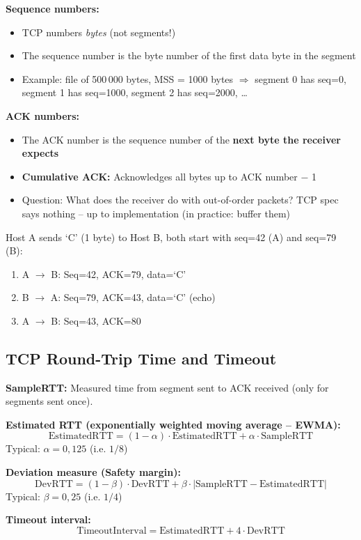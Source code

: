 \begin{keybox}
\textbf{Sequence numbers:}
\begin{itemize}[noitemsep]
    \item TCP numbers \emph{bytes} (not segments!)
    \item The sequence number is the byte number of the first data byte in the segment
    \item Example: file of 500\,000 bytes, MSS = 1000 bytes $\Rightarrow$ segment 0 has seq=0, segment 1 has seq=1000, segment 2 has seq=2000, \ldots
\end{itemize}

\textbf{ACK numbers:}
\begin{itemize}[noitemsep]
    \item The ACK number is the sequence number of the \textbf{next byte the receiver expects}
    \item \textbf{Cumulative ACK:} Acknowledges all bytes up to ACK number $-$ 1
    \item Question: What does the receiver do with out-of-order packets? TCP spec says nothing -- up to implementation (in practice: buffer them)
\end{itemize}
\end{keybox}

\begin{exambox}
Host A sends `C' (1 byte) to Host B, both start with seq=42 (A) and seq=79 (B):
\begin{enumerate}[noitemsep]
    \item A $\rightarrow$ B: Seq=42, ACK=79, data=`C'
    \item B $\rightarrow$ A: Seq=79, ACK=43, data=`C' (echo)
    \item A $\rightarrow$ B: Seq=43, ACK=80
\end{enumerate}
\end{exambox}

\subsection{TCP Round-Trip Time and Timeout}

\begin{formulabox}
\textbf{SampleRTT:} Measured time from segment sent to ACK received (only for segments sent once).

\textbf{Estimated RTT (exponentially weighted moving average -- EWMA):}
\[
\text{EstimatedRTT} = (1 - \alpha) \cdot \text{EstimatedRTT} + \alpha \cdot \text{SampleRTT}
\]
Typical: $\alpha = 0{,}125$ (i.e. $1/8$)

\textbf{Deviation measure (Safety margin):}
\[
\text{DevRTT} = (1 - \beta) \cdot \text{DevRTT} + \beta \cdot |\text{SampleRTT} - \text{EstimatedRTT}|
\]
Typical: $\beta = 0{,}25$ (i.e. $1/4$)

\textbf{Timeout interval:}
\[
\text{TimeoutInterval} = \text{EstimatedRTT} + 4 \cdot \text{DevRTT}
\]
\end{formulabox}

